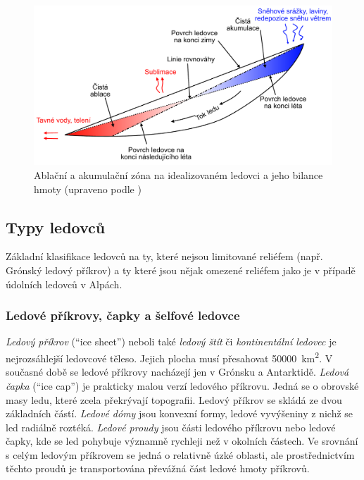 \begin{figure}
	\centering
	\includegraphics[width=\linewidth]{obrazky/glac/ledovec_mass_balance}
	\caption{Ablační a akumulační zóna na idealizovaném ledovci a jeho bilance hmoty (upraveno podle \textcite{summerfieldGlobalGeomorphologyIntroduction1999})}
	\label{fig:ledovecmassbalance}
\end{figure}

\subsection{Typy ledovců}
Základní klasifikace ledovců na ty, které nejsou limitované reliéfem (např. Grónský ledový příkrov) a ty které jsou nějak omezené reliéfem jako je v případě údolních ledovců v Alpách.

\subsubsection{Ledové příkrovy, čapky a šelfové ledovce}
\emph{Ledový příkrov} (\enquote{ice sheet}) neboli také \emph{ledový štít} či \emph{kontinentální ledovec} je nejrozsáhlejší ledovcové těleso. Jejich plocha musí přesahovat \SI{50000}{\square\kilo\metre}. V současné době se ledové příkrovy nacházejí jen v Grónsku a Antarktidě. \emph{Ledová čapka} (\enquote{ice cap}) je prakticky malou verzí ledového příkrovu. 
Jedná se o obrovské masy ledu, které zcela překrývají topografii. Ledový příkrov se skládá ze dvou základních částí. \emph{Ledové dómy} jsou konvexní formy, ledové vyvýšeniny z nichž se led radiálně roztéká. 
\emph{Ledové proudy} jsou části ledového příkrovu nebo ledové čapky, kde se led pohybuje významně rychleji než v okolních částech. Ve srovnání s celým ledovým příkrovem se jedná o relativně úzké oblasti, ale prostřednictvím těchto proudů je transportována převážná část ledové hmoty příkrovů. 

